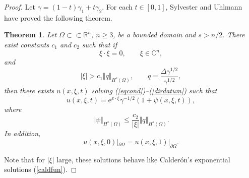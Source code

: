 \documentclass[10pt, a4paper, twoside, openright]{book}
\theoremstyle{definition}
\theoremstyle{plain}
\newtheorem{theorem}[subsection]{Theorem}
\theoremstyle{plain}
\theoremstyle{plain}
\theoremstyle{plain}
\theoremstyle{plain}
\theoremstyle{plain}
\theoremstyle{plain}
\theoremstyle{plain}
\begin{document}
\begin{proof}
Let $\gamma=(1-t)\gamma_1+t\gamma_2$.
For each $t\in[0,1]$, Sylvester and Uhlmann have proved the following theorem.

\begin{theorem}
\label{expgrowsol}
Let $\Omega\subset\subset\mathbb{R}^n$, $n\geq3$, be a bounded domain
and $s>n/2$.
There exist constants $c_1$ and $c_2$ such that if
$$\xi\cdot\xi=0,\qquad\xi\in\mathbb{C}^n,$$
and
$$|\xi|>c_1\Vert q\Vert_{H^s(\Omega)},
\qquad q=\frac{\Delta\gamma^{1/2}}{\gamma^{1/2}},$$
then there exists $u(x,\xi,t)$ solving (\ref{eqcond})--(\ref{dirdatum})
such that
\begin{equation}
\label{opticsol}
u(x,\xi,t)=\mathrm{e}^{x\cdot\xi}\gamma^{-1/2}(1+\psi(x,\xi,t)),
\end{equation}
where
\begin{equation}
\label{optics2}
\Vert\psi\Vert_{H^s(\Omega)}\leq\frac{c_2}{|\xi|}
\Vert q\Vert_{H^s(\Omega)}.
\end{equation}
In addition,
\begin{equation}
\label{opt}
u(x,\xi,0)|_{\partial\Omega}=u(x,\xi,1)|_{\partial\Omega}.
\end{equation}
\end{theorem}
Note that for $|\xi|$ large, these solutions behave like Calder\'on's
exponential solutions (\ref{caldfun}).


\end{proof}
\end{document}
